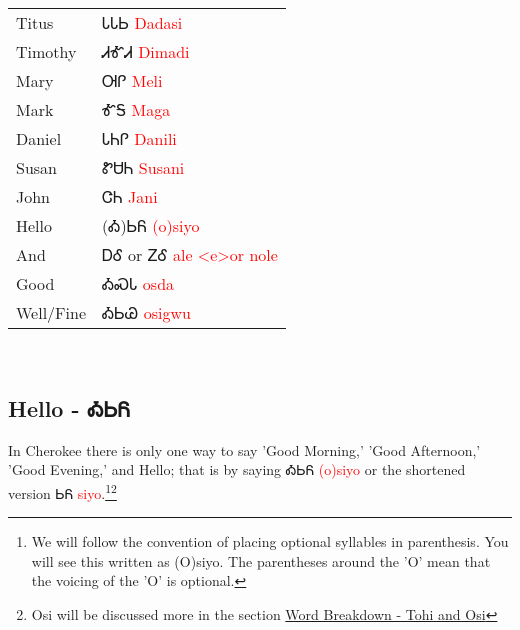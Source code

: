 \begin{minipage}{\linewidth}
\begin{tabular}{p{5cm} p{9cm}}
Titus & ᏓᏓᏏ 
 \newline \textcolor{red}{Dadasi}\\
Timothy & ᏗᎹᏗ 
 \newline \textcolor{red}{Dimadi}\\
Mary & ᎺᎵ 
 \newline \textcolor{red}{Meli}\\
Mark & ᎹᎦ 
 \newline \textcolor{red}{Maga}\\
Daniel & ᏓᏂᎵ 
 \newline \textcolor{red}{Danili}\\
Susan & ᏑᏌᏂ 
 \newline \textcolor{red}{Susani}\\
John & ᏣᏂ 
 \newline \textcolor{red}{Jani}\\
Hello & (Ꭳ)ᏏᏲ 
 \newline \textcolor{red}{(o)siyo}\\
And & ᎠᎴ 
  or ᏃᎴ 
 \newline \textcolor{red}{ale <e>or nole}\\
Good & ᎣᏍᏓ 
 \newline \textcolor{red}{osda}\\
Well/Fine & ᎣᏏᏊ 
 \newline \textcolor{red}{osigwu}\\
\end{tabular}
\end{minipage}

\
\subsection{Hello - ᎣᏏᏲ}
In Cherokee there is only one way to say 'Good Morning,' 'Good Afternoon,' 'Good Evening,' and Hello; that is by saying ᎣᏏᏲ \textcolor{red}{(o)siyo} or the shortened version ᏏᏲ \textcolor{red}{siyo}.\footnote{We will follow the convention of placing optional syllables in parenthesis.  You will see this written as (O)siyo.  The parentheses around the 'O' mean that the voicing of the 'O' is optional.}\footnote{Osi will be discussed more in the section \hyperref[sec:wordBreakdownTohiOsi]{Word Breakdown - Tohi and Osi}}
